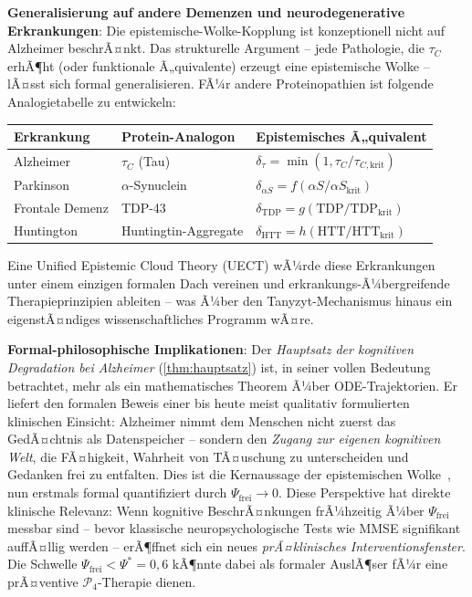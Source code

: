 ﻿\documentclass[12pt,a4paper]{article}
\theoremstyle{definition}
\begin{document}
	\textbf{Generalisierung auf andere Demenzen und neurodegenerative Erkrankungen}:
	Die epistemische-Wolke-Kopplung ist konzeptionell nicht auf Alzheimer beschrÃ¤nkt. Das strukturelle Argument -- jede Pathologie, die $\tau_C$ erhÃ¶ht (oder funktionale Ã„quivalente) erzeugt eine epistemische Wolke -- lÃ¤sst sich formal generalisieren. FÃ¼r andere Proteinopathien ist folgende Analogietabelle zu entwickeln:
	\begin{center}
	\small
	\begin{tabular}{lll}
		\hline
		\textbf{Erkrankung} & \textbf{Protein-Analogon} & \textbf{Epistemisches Ã„quivalent} \\
		\hline
		Alzheimer & $\tau_C$ (Tau) & $\delta_\tau = \min(1, \tau_C/\tau_{C,\mathrm{krit}})$ \\
		Parkinson & $\alpha$-Synuclein & $\delta_{\alpha S} = f(\alpha S / \alpha S_{\mathrm{krit}})$ \\
		Frontale Demenz & TDP-43 & $\delta_{\mathrm{TDP}} = g(\mathrm{TDP}/\mathrm{TDP}_{\mathrm{krit}})$ \\
		Huntington & Huntingtin-Aggregate & $\delta_{\mathrm{HTT}} = h(\mathrm{HTT}/\mathrm{HTT}_{\mathrm{krit}})$ \\
		\hline
	\end{tabular}
	\end{center}
	Eine Unified Epistemic Cloud Theory (UECT) wÃ¼rde diese Erkrankungen unter einem einzigen formalen Dach vereinen und erkrankungs-Ã¼bergreifende Therapieprinzipien ableiten -- was Ã¼ber den Tanyzyt-Mechanismus hinaus ein eigenstÃ¤ndiges wissenschaftliches Programm wÃ¤re.

	\textbf{Formal-philosophische Implikationen}:
	Der \emph{Hauptsatz der kognitiven Degradation bei Alzheimer} (\cref{thm:hauptsatz}) ist, in seiner vollen Bedeutung betrachtet, mehr als ein mathematisches Theorem Ã¼ber ODE-Trajektorien. Er liefert den formalen Beweis einer bis heute meist qualitativ formulierten klinischen Einsicht: Alzheimer nimmt dem Menschen nicht zuerst das GedÃ¤chtnis als Datenspeicher -- sondern den \emph{Zugang zur eigenen kognitiven Welt}, die FÃ¤higkeit, Wahrheit von TÃ¤uschung zu unterscheiden und Gedanken frei zu entfalten. Dies ist die Kernaussage der epistemischen Wolke~\cite{Epp2026brn}, nun erstmals formal quantifiziert durch $\Psi_{\mathrm{frei}} \to 0$.
	Diese Perspektive hat direkte klinische Relevanz: Wenn kognitive BeschrÃ¤nkungen frÃ¼hzeitig Ã¼ber $\Psi_{\mathrm{frei}}$ messbar sind -- bevor klassische neuropsychologische Tests wie MMSE signifikant auffÃ¤llig werden -- erÃ¶ffnet sich ein neues \emph{prÃ¤klinisches Interventionsfenster}. Die Schwelle $\Psi_{\mathrm{frei}} < \Psi^* = 0{,}6$ kÃ¶nnte dabei als formaler AuslÃ¶ser fÃ¼r eine prÃ¤ventive $\mathcal{P}_4$-Therapie dienen.
\end{document}

